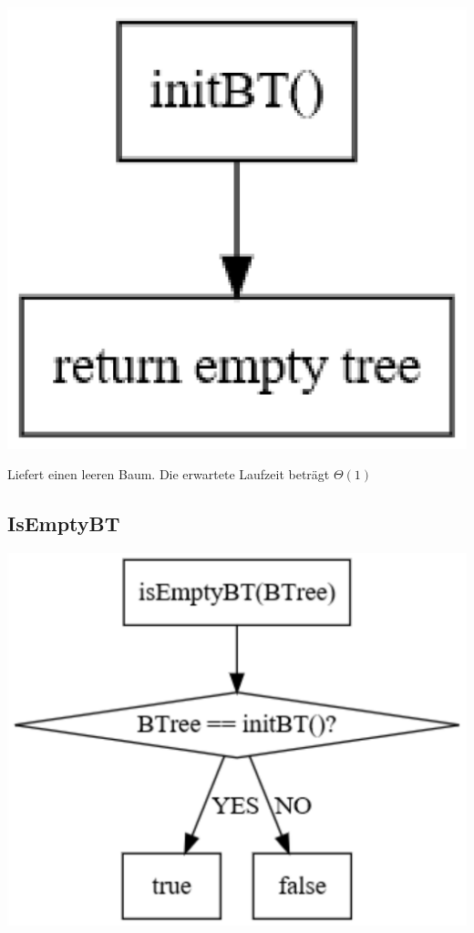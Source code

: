 \documentclass[11pt]{article}
\begin{document}
    \begin{center}
        \includegraphics[width=1\columnwidth] {init.pdf}
    \end{center}
    
    Liefert einen leeren Baum.
    Die erwartete Laufzeit beträgt
    \begin{math}
        \Theta(1)
    \end{math}

    \subsection{IsEmptyBT}\label{subsec:isemptybt}
    
    \begin{center}
        \includegraphics[width=1\columnwidth] {isempty.pdf}
    \end{center}
    
\end{document}
